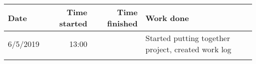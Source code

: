 \documentclass{article}
\begin{document}
\begin{table}[h!]
    \begin{tabular}{l|r|r|p{10cm}}  %
        \textbf{Date} & \textbf{Time started} & \textbf{Time finished} & \textbf{Work done} \\
        \hline
        6/5/2019    &   13:00   &   &   Started putting together project, created work log\\
        \hline
        &   &   &   \\
    \end{tabular}
\end{table}
\end{document}

